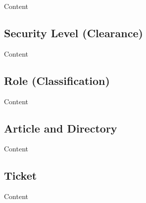 Content


\subsection{Security Level (Clearance)}
\label{ch:hopot_project:project_components:security_level}

Content


\subsection{Role (Classification)}
\label{ch:hopot_project:role}

Content


\subsection{Article and Directory}
\label{ch:hopot_project:article}

Content


\subsection{Ticket}
\label{ch:hopot_project:ticket}

Content
